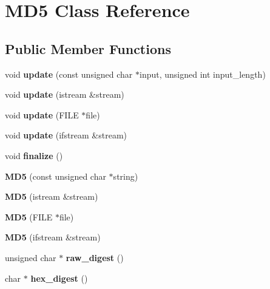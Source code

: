 \section{M\-D5 Class Reference}
\label{classMD5}
\subsection*{Public Member Functions}
\begin{DoxyCompactItemize}
\item 
void {\bfseries update} (const unsigned char $\ast$input, unsigned int input\-\_\-length)\label{classMD5_a15f269f3e39cd8b36a7fa6bf0459e619}

\item 
void {\bfseries update} (istream \&stream)\label{classMD5_ac1e228c5348da56a5fc47ea87b47f6c3}

\item 
void {\bfseries update} (F\-I\-L\-E $\ast$file)\label{classMD5_a870b8675bca4d33b858d2b1abce9981a}

\item 
void {\bfseries update} (ifstream \&stream)\label{classMD5_a2b0e75c47f41e99830e2a00bbd2debf1}

\item 
void {\bfseries finalize} ()\label{classMD5_ade6a48e72d63710ab567cf473a3af0b0}

\item 
{\bfseries M\-D5} (const unsigned char $\ast$string)\label{classMD5_ab7e277b2ff74c25a9ef8af239e133701}

\item 
{\bfseries M\-D5} (istream \&stream)\label{classMD5_a78e603b5b35ab0d832a493a157ed89dc}

\item 
{\bfseries M\-D5} (F\-I\-L\-E $\ast$file)\label{classMD5_a42be31aa712ef5450fad065ff7697f47}

\item 
{\bfseries M\-D5} (ifstream \&stream)\label{classMD5_a355a8e72bbb682375610be728b3b93a2}

\item 
unsigned char $\ast$ {\bfseries raw\-\_\-digest} ()\label{classMD5_aaf526d077ce13986854ee6223adaad5b}

\item 
char $\ast$ {\bfseries hex\-\_\-digest} ()\label{classMD5_a0d2767cc5ea3ce59c80e28ae64497d7e}

\end{DoxyCompactItemize}
